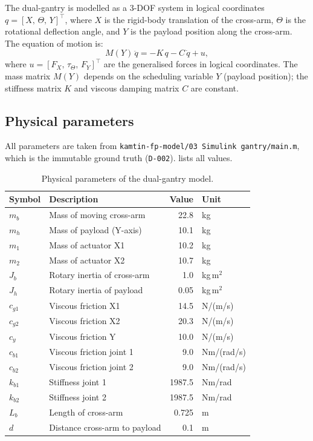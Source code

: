 \documentclass[11pt,a4paper]{article}
\newcommand{\T}{^{\!\top}}
\newcommand{\qdot}{\dot{q}}
\newcommand{\qddot}{\ddot{q}}
\newcommand{\decref}[1]{\texttt{D-#1}}
\begin{document}
The dual-gantry is modelled as a 3-DOF system in logical coordinates
$q = [X,\, \Theta,\, Y]\T$, where $X$ is the rigid-body translation of the cross-arm,
$\Theta$ is the rotational deflection angle, and $Y$ is the payload position along the
cross-arm. The equation of motion is:
\begin{equation}
\label{eq:eom}
M(Y)\, \qddot = -K\, q - C\, \qdot + u,
\end{equation}
where $u = [F_X,\, \tau_\Theta,\, F_Y]\T$ are the generalised forces in logical coordinates.
The mass matrix $M(Y)$ depends on the scheduling variable $Y$ (payload position); the
stiffness matrix $K$ and viscous damping matrix $C$ are constant.

\subsection{Physical parameters}
\label{sec:params}

All parameters are taken from \texttt{kamtin-fp-model/03 Simulink gantry/main.m},
which is the immutable ground truth (\decref{002}).  lists all values.

\begin{table}[ht]
\centering
\caption{Physical parameters of the dual-gantry model.}
\label{tab:params}
\begin{tabular}{llrl}
\toprule
Symbol & Description & Value & Unit \\
\midrule
$m_b$  & Mass of moving cross-arm        & 22.8   & kg \\
$m_h$  & Mass of payload (Y-axis)        & 10.1   & kg \\
$m_1$  & Mass of actuator X1             & 10.2   & kg \\
$m_2$  & Mass of actuator X2             & 10.7   & kg \\
$J_b$  & Rotary inertia of cross-arm     & 1.0    & kg\,m$^2$ \\
$J_h$  & Rotary inertia of payload       & 0.05   & kg\,m$^2$ \\
$c_{g1}$ & Viscous friction X1           & 14.5   & N/(m/s) \\
$c_{g2}$ & Viscous friction X2           & 20.3   & N/(m/s) \\
$c_y$    & Viscous friction Y            & 10.0   & N/(m/s) \\
$c_{b1}$ & Viscous friction joint 1      & 9.0    & Nm/(rad/s) \\
$c_{b2}$ & Viscous friction joint 2      & 9.0    & Nm/(rad/s) \\
$k_{b1}$ & Stiffness joint 1             & 1987.5 & Nm/rad \\
$k_{b2}$ & Stiffness joint 2             & 1987.5 & Nm/rad \\
$L_b$    & Length of cross-arm           & 0.725  & m \\
$d$      & Distance cross-arm to payload & 0.1    & m \\
\bottomrule
\end{tabular}
\end{table}
\end{document}
